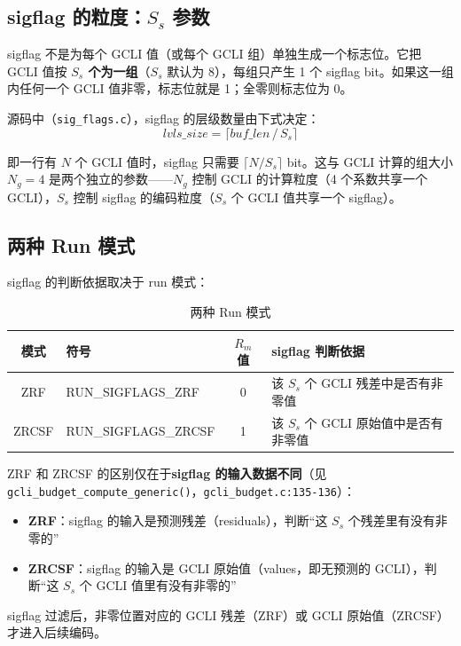 \subsection{sigflag 的粒度：$S_s$ 参数}

sigflag 不是为每个 GCLI 值（或每个 GCLI 组）单独生成一个标志位。它把 GCLI 值按 \textbf{$S_s$ 个为一组}（$S_s$ 默认为 8），每组只产生 1 个 sigflag bit。如果这一组内任何一个 GCLI 值非零，标志位就是 1；全零则标志位为 0。

源码中（\texttt{sig\_flags.c}），sigflag 的层级数量由下式决定：
\begin{equation}
\mathit{lvls\_size} = \lceil \mathit{buf\_len} \,/\, S_s \rceil
\end{equation}

即一行有 $N$ 个 GCLI 值时，sigflag 只需要 $\lceil N / S_s \rceil$ bit。这与 GCLI 计算的组大小 $N_g = 4$ 是两个独立的参数——$N_g$ 控制 GCLI 的计算粒度（4 个系数共享一个 GCLI），$S_s$ 控制 sigflag 的编码粒度（$S_s$ 个 GCLI 值共享一个 sigflag）。

\subsection{两种 Run 模式}

sigflag 的判断依据取决于 run 模式：

\begin{table}[H]
\centering
\caption{两种 Run 模式}
\begin{tabular}{@{}clcp{5cm}@{}}
\toprule
模式 & 符号 & $R_m$ 值 & sigflag 判断依据 \\
\midrule
ZRF & RUN\_SIGFLAGS\_ZRF & 0 & 该 $S_s$ 个 GCLI 残差中是否有非零值 \\
ZRCSF & RUN\_SIGFLAGS\_ZRCSF & 1 & 该 $S_s$ 个 GCLI 原始值中是否有非零值 \\
\bottomrule
\end{tabular}
\end{table}

\begin{engineeringnote}
ZRF 和 ZRCSF 的区别仅在于\textbf{sigflag 的输入数据不同}（见 \texttt{gcli\_budget\_compute\_generic()}，\texttt{gcli\_budget.c:135-136}）：
\begin{itemize}
  \item \textbf{ZRF}：sigflag 的输入是预测残差（residuals），判断``这 $S_s$ 个残差里有没有非零的''
  \item \textbf{ZRCSF}：sigflag 的输入是 GCLI 原始值（values，即无预测的 GCLI），判断``这 $S_s$ 个 GCLI 值里有没有非零的''
\end{itemize}
sigflag 过滤后，非零位置对应的 GCLI 残差（ZRF）或 GCLI 原始值（ZRCSF）才进入后续编码。
\end{engineeringnote}

